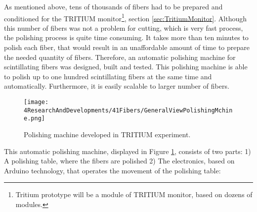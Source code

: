As mentioned above, tens of thousands of fibers had to be prepared and conditioned for the TRITIUM monitor\footnote{Tritium prototype will be a module of TRITIUM monitor, based on dozens of modules.}, section \ref{sec:TritiumMonitor}. Although this number of fibers was not a problem for cutting, which is very fast process, the polishing process is quite time consuming. It takes more than ten minutes to polish each fiber, that would result in an unaffordable amount of time to prepare the needed quantity of fibers. Therefore, an automatic polishing machine for scintillating fibers was designed, built and tested. This polishing machine is able to polish up to one hundred scintillating fibers at the same time and automatically. Furthermore, it is easily scalable to larger number of fibers.

\begin{figure}[h]
\centering
\texttt{[image: 4ResearchAndDevelopments/41Fibers/GeneralViewPolishingMchine.png]}
\caption{Polishing machine developed in TRITIUM experiment.\label{fig:GeneralViewPolishingMachine}}
\end{figure}
This automatic polishing machine, displayed in Figure \ref{fig:GeneralViewPolishingMachine}, consists of two parts: 1) A polishing table, where the fibers are polished 2) The electronics, based on Arduino technology, that operates the movement of the polishing table:

